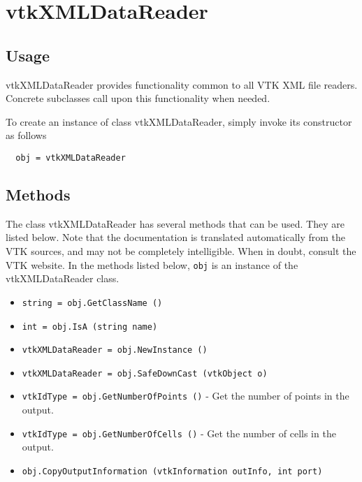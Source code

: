 \section{vtkXMLDataReader}

\subsection{Usage}

 vtkXMLDataReader provides functionality common to all VTK XML file
 readers.  Concrete subclasses call upon this functionality when
 needed.

To create an instance of class vtkXMLDataReader, simply
invoke its constructor as follows
\begin{verbatim}
  obj = vtkXMLDataReader
\end{verbatim}
\subsection{Methods}

The class vtkXMLDataReader has several methods that can be used.
  They are listed below.
Note that the documentation is translated automatically from the VTK sources,
and may not be completely intelligible.  When in doubt, consult the VTK website.
In the methods listed below, \verb|obj| is an instance of the vtkXMLDataReader class.
\begin{itemize}
\item  \verb|string = obj.GetClassName ()|

\item  \verb|int = obj.IsA (string name)|

\item  \verb|vtkXMLDataReader = obj.NewInstance ()|

\item  \verb|vtkXMLDataReader = obj.SafeDownCast (vtkObject o)|

\item  \verb|vtkIdType = obj.GetNumberOfPoints ()| -  Get the number of points in the output.

\item  \verb|vtkIdType = obj.GetNumberOfCells ()| -  Get the number of cells in the output.

\item  \verb|obj.CopyOutputInformation (vtkInformation outInfo, int port)|

\end{itemize}
